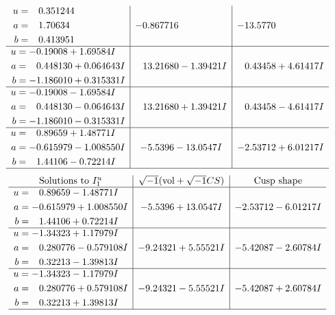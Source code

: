 \documentclass[1p]{elsarticle_modified}
\theoremstyle{definition}
\newcommand{\I}{\sqrt{-1}}
\begin{document}
$$\begin{array}{c|c|c}
\begin{aligned}
u &= \phantom{-}0.351244\phantom{ +0.000000I} \\
a &= \phantom{-}1.70634\phantom{ +0.000000I} \\
b &= \phantom{-}0.413951\phantom{ +0.000000I}\end{aligned}
 & -0.867716\phantom{ +0.000000I} & -13.5770\phantom{ +0.000000I} \\ \hline\begin{aligned}
u &= -0.19008 + 1.69584 I \\
a &= \phantom{-}0.448130 + 0.064643 I \\
b &= -1.186010 + 0.315331 I\end{aligned}
 & \phantom{-}13.21680 - 1.39421 I & \phantom{-}0.43458 + 4.61417 I \\ \hline\begin{aligned}
u &= -0.19008 - 1.69584 I \\
a &= \phantom{-}0.448130 - 0.064643 I \\
b &= -1.186010 - 0.315331 I\end{aligned}
 & \phantom{-}13.21680 + 1.39421 I & \phantom{-}0.43458 - 4.61417 I \\ \hline\begin{aligned}
u &= \phantom{-}0.89659 + 1.48771 I \\
a &= -0.615979 - 1.008550 I \\
b &= \phantom{-}1.44106 - 0.72214 I\end{aligned}
 & -5.5396 - 13.0547 I & -2.53712 + 6.01217 I\\
 \hline 
 \end{array}$$\newpage$$\begin{array}{c|c|c}  
\text{Solutions to }I^u_{1}& \I (\text{vol} + \sqrt{-1}CS) & \text{Cusp shape}\\
 \hline 
\begin{aligned}
u &= \phantom{-}0.89659 - 1.48771 I \\
a &= -0.615979 + 1.008550 I \\
b &= \phantom{-}1.44106 + 0.72214 I\end{aligned}
 & -5.5396 + 13.0547 I & -2.53712 - 6.01217 I \\ \hline\begin{aligned}
u &= -1.34323 + 1.17979 I \\
a &= \phantom{-}0.280776 - 0.579108 I \\
b &= \phantom{-}0.32213 - 1.39813 I\end{aligned}
 & -9.24321 + 5.55521 I & -5.42087 - 2.60784 I \\ \hline\begin{aligned}
u &= -1.34323 - 1.17979 I \\
a &= \phantom{-}0.280776 + 0.579108 I \\
b &= \phantom{-}0.32213 + 1.39813 I\end{aligned}
 & -9.24321 - 5.55521 I & -5.42087 + 2.60784 I\\
 \hline 
 \end{array}$$\newpage\newpage\renewcommand{\arraystretch}{1}
\end{document}
